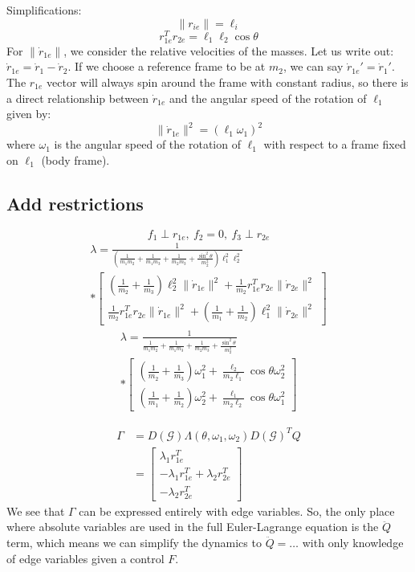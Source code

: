\documentclass[conference]{IEEEtran}
\begin{document}
Simplifications:
$$\|r_{ie}\|=\ell_i$$
$$r_{1e}^Tr_{2e}=\ell_1\ell_2\cos\theta$$
For $\|\dot{r}_{1e}\|$, we consider the relative velocities of the masses. Let us write out: $\dot{r}_{1e}=\dot{r}_1-\dot{r}_2$. If we choose a reference frame to be at $m_2$, we can say $\dot{r}_{1e}'=\dot{r}_1'$. The $r_{1e}$ vector will always spin around the frame with constant radius, so there is a direct relationship between $\dot{r}_{1e}$ and the angular speed of the rotation of $\ell_1$ given by:
$$\|\dot{r}_{1e}\|^2=(\ell_1\omega_1)^2$$
where $\omega_1$ is the angular speed of the rotation of $\ell_1$ with respect to a frame fixed on $\ell_1$ (body frame).

\subsection{Add restrictions}
$$f_1\perp r_{1e},\:f_2=0,\:f_3\perp r_{2e}$$
\begin{multline} \label{eq:lambda}
    \lambda=\frac{1}{\left(\frac{1}{m_1m_2}+\frac{1}{m_1m_3}+\frac{1}{m_2m_3}+\frac{\sin^2\theta}{m_2^2}\right)\ell_1^2\ell_2^2}\\
    *\begin{bmatrix}
        \left(\frac{1}{m_2}+\frac{1}{m_3}\right)\ell_2^2\|\dot{r}_{1e}\|^2 + \frac{1}{m_2}r_{1e}^Tr_{2e}\|\dot{r}_{2e}\|^2\\
        \frac{1}{m_2}r_{1e}^Tr_{2e}\|\dot{r}_{1e}\|^2 + \left(\frac{1}{m_1}+\frac{1}{m_2}\right)\ell_1^2\|\dot{r}_{2e}\|^2
    \end{bmatrix}
\end{multline}
\begin{multline}
    \lambda=\frac{1}{\frac{1}{m_1m_2}+\frac{1}{m_1m_3}+\frac{1}{m_2m_3}+\frac{\sin^2\theta}{m_2^2}}\\*\begin{bmatrix}
        \left(\frac{1}{m_2}+\frac{1}{m_3}\right)\omega_1^2 + \frac{\ell_2}{m_2\ell_1}\cos\theta\omega_2^2\\
        \left(\frac{1}{m_1}+\frac{1}{m_2}\right)\omega_2^2 + \frac{\ell_1}{m_2\ell_2}\cos\theta\omega_1^2
    \end{bmatrix}
\end{multline}

\begin{align*}
    \Gamma&=D(\mathcal{G})\Lambda(\theta, \omega_1, \omega_2)D(\mathcal{G})^TQ\\
    &=\begin{bmatrix}
        \lambda_1r_{1e}^T\\
        -\lambda_1r_{1e}^T+\lambda_2r_{2e}^T\\
        -\lambda_2r_{2e}^T
    \end{bmatrix}
\end{align*}
We see that $\Gamma$ can be expressed entirely with edge variables. So, the only place where absolute variables are used in the full Euler-Lagrange equation is the $\ddot{Q}$ term, which means we can simplify the dynamics to $\ddot{Q}=\hdots$ with only knowledge of edge variables given a control $F$.
\end{document}
